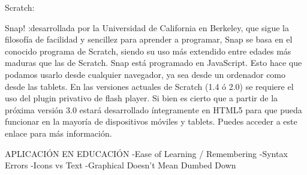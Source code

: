 Scratch:

Snap! :desarrollada por la Universidad de California en Berkeley, que sigue la filosofía de facilidad y sencillez para aprender a programar,  Snap se basa en el conocido programa de Scratch, siendo su uso más extendido entre edades más maduras que las de Scratch.
Snap está programado en JavaScript. Esto hace que podamos usarlo desde cualquier navegador, ya sea desde un ordenador como desde las tablets.
En las versiones actuales de Scratch (1.4 ó 2.0) se requiere el uso del plugin privativo de flash player. Si bien es cierto que a partir de la próxima versión 3.0 estará desarrollado íntegramente en HTML5 para que pueda funcionar en la mayoría de dispositivos móviles y tablets. Puedes acceder a este enlace para más información.

APLICACIÓN EN EDUCACIÓN
-Ease of Learning / Remembering
-Syntax Errors
-Icons vs Text
-Graphical Doesn't Mean Dumbed Down